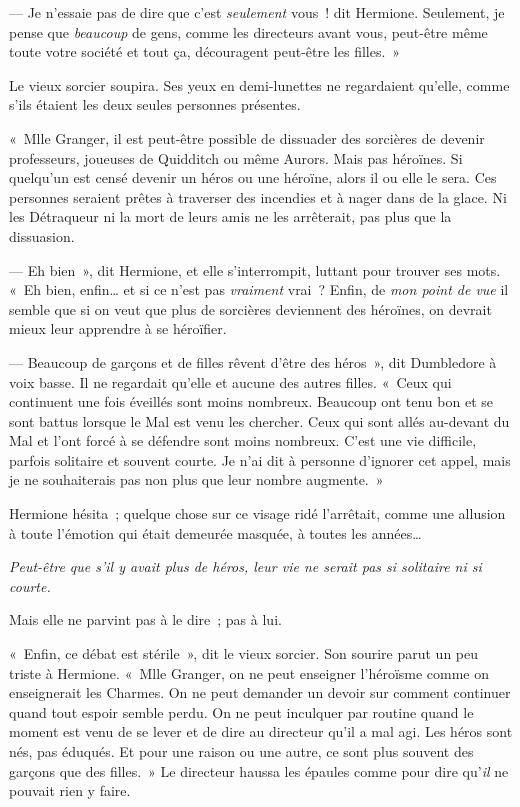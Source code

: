 --- Je n'essaie pas de dire que c'est \emph{seulement} vous~! dit Hermione. Seulement, je pense que \emph{beaucoup} de gens, comme les directeurs avant vous, peut-être même toute votre société et tout ça, découragent peut-être les filles.~»

Le vieux sorcier soupira. Ses yeux en demi-lunettes ne regardaient qu'elle, comme s'ils étaient les deux seules personnes présentes.

«~Mlle Granger, il est peut-être possible de dissuader des sorcières de devenir professeurs, joueuses de Quidditch ou même Aurors. Mais pas héroïnes. Si quelqu'un est censé devenir un héros ou une héroïne, alors il ou elle le sera. Ces personnes seraient prêtes à traverser des incendies et à nager dans de la glace. Ni les Détraqueur ni la mort de leurs amis ne les arrêterait, pas plus que la dissuasion.

--- Eh bien~», dit Hermione, et elle s'interrompit, luttant pour trouver ses mots. «~Eh bien, enfin… et si ce n'est pas \emph{vraiment} vrai~? Enfin, de \emph{mon point de vue} il semble que si on veut que plus de sorcières deviennent des héroïnes, on devrait mieux leur apprendre à se héroïfier.

--- Beaucoup de garçons et de filles rêvent d'être des héros~», dit Dumbledore à voix basse. Il ne regardait qu'elle et aucune des autres filles. «~Ceux qui continuent une fois éveillés sont moins nombreux. Beaucoup ont tenu bon et se sont battus lorsque le Mal est venu les chercher. Ceux qui sont allés au-devant du Mal et l'ont forcé à se défendre sont moins nombreux. C'est une vie difficile, parfois solitaire et souvent courte. Je n'ai dit à personne d'ignorer cet appel, mais je ne souhaiterais pas non plus que leur nombre augmente.~»

Hermione hésita~; quelque chose sur ce visage ridé l'arrêtait, comme une allusion à toute l'émotion qui était demeurée masquée, à toutes les années…

\emph{Peut-être que s'il y avait plus de héros, leur vie ne serait pas si solitaire ni si courte.}

Mais elle ne parvint pas à le dire~; pas à lui.

«~Enfin, ce débat est stérile~», dit le vieux sorcier. Son sourire parut un peu triste à Hermione. «~Mlle Granger, on ne peut enseigner l'héroïsme comme on enseignerait les Charmes. On ne peut demander un devoir sur comment continuer quand tout espoir semble perdu. On ne peut inculquer par routine quand le moment est venu de se lever et de dire au directeur qu'il a mal agi. Les héros sont nés, pas éduqués. Et pour une raison ou une autre, ce sont plus souvent des garçons que des filles.~» Le directeur haussa les épaules comme pour dire qu'\emph{il} ne pouvait rien y faire.

